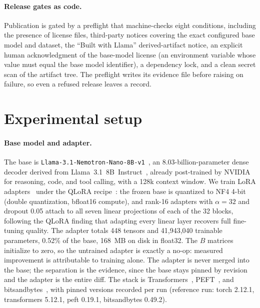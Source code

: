 \documentclass{article}
\newcommand{\basemodel}{\texttt{Llama-3.1-Nemotron-Nano-8B-v1}}
\begin{document}
\paragraph{Release gates as code.}
Publication is gated by a preflight that machine-checks eight conditions, including the presence of license files, third-party notices covering the exact configured base model and dataset, the ``Built with Llama'' derived-artifact notice, an explicit human acknowledgment of the base-model license (an environment variable whose value must equal the base model identifier), a dependency lock, and a clean secret scan of the artifact tree. The preflight writes its evidence file before raising on failure, so even a refused release leaves a record.

\section{Experimental setup}
\label{sec:setup}

\paragraph{Base model and adapter.}
The base is \basemodel{}~\citep{bercovich2025llamanemotron}, an 8.03-billion-parameter dense decoder derived from Llama~3.1~8B~Instruct~\citep{grattafiori2024llama3}, already post-trained by NVIDIA for reasoning, code, and tool calling, with a 128k context window. We train LoRA adapters~\citep{hu2021lora} under the QLoRA recipe~\citep{dettmers2023qlora}: the frozen base is quantized to NF4 4-bit (double quantization, bfloat16 compute), and rank-16 adapters with $\alpha{=}32$ and dropout 0.05 attach to all seven linear projections of each of the 32 blocks, following the QLoRA finding that adapting every linear layer recovers full fine-tuning quality. The adapter totals 448 tensors and 41{,}943{,}040 trainable parameters, 0.52\% of the base, 168~MB on disk in float32. The $B$ matrices initialize to zero, so the untrained adapter is exactly a no-op: measured improvement is attributable to training alone. The adapter is never merged into the base; the separation is the evidence, since the base stays pinned by revision and the adapter is the entire diff. The stack is Transformers~\citep{wolf2019transformers}, PEFT~\citep{mangrulkar2022peft}, and bitsandbytes~\citep{dettmers2022llmint8}, with pinned versions recorded per run (reference run: torch 2.12.1, transformers 5.12.1, peft 0.19.1, bitsandbytes 0.49.2).
\end{document}
